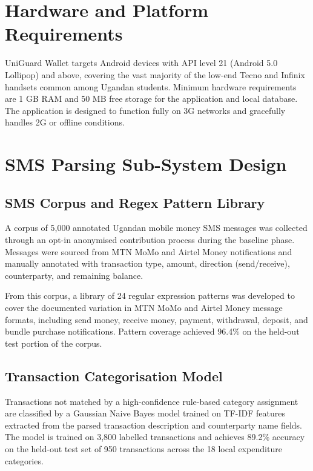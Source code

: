 \documentclass[12pt,a4paper]{report}
\begin{document}
\section{Hardware and Platform Requirements}

UniGuard Wallet targets Android devices with API level 21 (Android 5.0 Lollipop) and
above, covering the vast majority of the low-end Tecno and Infinix handsets common
among Ugandan students. Minimum hardware requirements are 1 GB RAM and 50 MB
free storage for the application and local database. The application is designed to
function fully on 3G networks and gracefully handles 2G or offline conditions.

\section{SMS Parsing Sub-System Design}

\subsection{SMS Corpus and Regex Pattern Library}

A corpus of 5,000 annotated Ugandan mobile money SMS messages was collected
through an opt-in anonymised contribution process during the baseline phase. Messages
were sourced from MTN MoMo and Airtel Money notifications and manually annotated
with transaction type, amount, direction (send/receive), counterparty, and remaining
balance.

From this corpus, a library of 24 regular expression patterns was developed to cover
the documented variation in MTN MoMo and Airtel Money message formats, including
send money, receive money, payment, withdrawal, deposit, and bundle purchase
notifications. Pattern coverage achieved 96.4\% on the held-out test portion of the
corpus.

\subsection{Transaction Categorisation Model}

Transactions not matched by a high-confidence rule-based category assignment are
classified by a Gaussian Naive Bayes model trained on TF-IDF features extracted from
the parsed transaction description and counterparty name fields. The model is trained on
3,800 labelled transactions and achieves 89.2\% accuracy on the held-out test set of 950
transactions across the 18 local expenditure categories.
\end{document}
